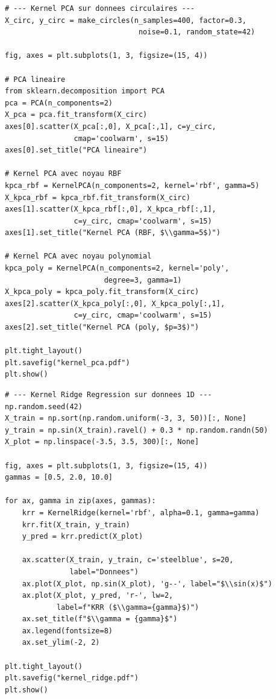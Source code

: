 \begin{codeblock}[title=\textbf{Kernel PCA~: r\'eduction non lin\'eaire}]
\begin{verbatim}
# --- Kernel PCA sur donnees circulaires ---
X_circ, y_circ = make_circles(n_samples=400, factor=0.3,
                               noise=0.1, random_state=42)

fig, axes = plt.subplots(1, 3, figsize=(15, 4))

# PCA lineaire
from sklearn.decomposition import PCA
pca = PCA(n_components=2)
X_pca = pca.fit_transform(X_circ)
axes[0].scatter(X_pca[:,0], X_pca[:,1], c=y_circ,
                cmap='coolwarm', s=15)
axes[0].set_title("PCA lineaire")

# Kernel PCA avec noyau RBF
kpca_rbf = KernelPCA(n_components=2, kernel='rbf', gamma=5)
X_kpca_rbf = kpca_rbf.fit_transform(X_circ)
axes[1].scatter(X_kpca_rbf[:,0], X_kpca_rbf[:,1],
                c=y_circ, cmap='coolwarm', s=15)
axes[1].set_title("Kernel PCA (RBF, $\\gamma=5$)")

# Kernel PCA avec noyau polynomial
kpca_poly = KernelPCA(n_components=2, kernel='poly',
                       degree=3, gamma=1)
X_kpca_poly = kpca_poly.fit_transform(X_circ)
axes[2].scatter(X_kpca_poly[:,0], X_kpca_poly[:,1],
                c=y_circ, cmap='coolwarm', s=15)
axes[2].set_title("Kernel PCA (poly, $p=3$)")

plt.tight_layout()
plt.savefig("kernel_pca.pdf")
plt.show()
\end{verbatim}
\end{codeblock}

\begin{codeblock}[title=\textbf{Kernel Ridge Regression}]
\begin{verbatim}
# --- Kernel Ridge Regression sur donnees 1D ---
np.random.seed(42)
X_train = np.sort(np.random.uniform(-3, 3, 50))[:, None]
y_train = np.sin(X_train).ravel() + 0.3 * np.random.randn(50)
X_plot = np.linspace(-3.5, 3.5, 300)[:, None]

fig, axes = plt.subplots(1, 3, figsize=(15, 4))
gammas = [0.5, 2.0, 10.0]

for ax, gamma in zip(axes, gammas):
    krr = KernelRidge(kernel='rbf', alpha=0.1, gamma=gamma)
    krr.fit(X_train, y_train)
    y_pred = krr.predict(X_plot)

    ax.scatter(X_train, y_train, c='steelblue', s=20,
               label="Donnees")
    ax.plot(X_plot, np.sin(X_plot), 'g--', label="$\\sin(x)$")
    ax.plot(X_plot, y_pred, 'r-', lw=2,
            label=f"KRR ($\\gamma={gamma}$)")
    ax.set_title(f"$\\gamma = {gamma}$")
    ax.legend(fontsize=8)
    ax.set_ylim(-2, 2)

plt.tight_layout()
plt.savefig("kernel_ridge.pdf")
plt.show()
\end{verbatim}
\end{codeblock}

